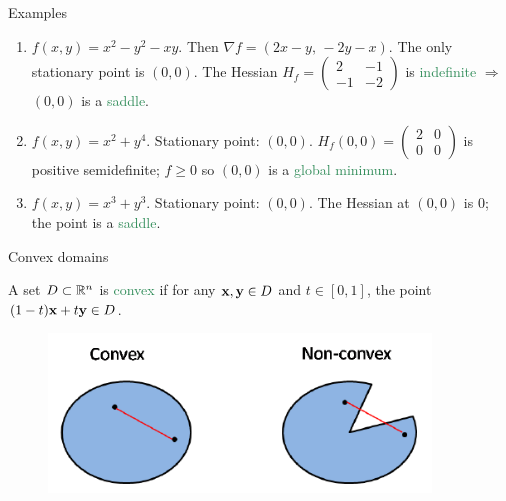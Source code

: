 \documentclass[11pt,aspectratio=169]{beamer}
\begin{document}
\begin{frame}{Examples}

\begin{enumerate}
\item \(f(x,y)=x^2-y^2-xy\). Then \(\nabla f=(2x-y,\,-2y-x)\). The only stationary point is \((0,0)\). The Hessian
\(
H_f=\begin{pmatrix}2&-1\\ -1&-2\end{pmatrix}
\)
is \textcolor{SeaGreen}{indefinite} \(\Rightarrow\) \((0,0)\) is a \textcolor{SeaGreen}{saddle}.
\item \(f(x,y)=x^2+y^4\). Stationary point: \((0,0)\). 
\(
H_f(0,0)=\begin{pmatrix}2&0\\ 0&0\end{pmatrix}
\)
is positive semidefinite; \(f\ge 0\) so \((0,0)\) is a \textcolor{SeaGreen}{global minimum}.
\item \(f(x,y)=x^3+y^3\). Stationary point: \((0,0)\). The Hessian at \((0,0)\) is \(0\); the point is a \textcolor{SeaGreen}{saddle}.
\end{enumerate}

\end{frame}

\begin{frame}{Convex domains}

A set \(D\subset\mathbb R^n\) is \textcolor{SeaGreen}{convex} if for any \({\bf x},{\bf y}\in D\) and \(t\in[0,1]\), the point \((1-t){\bf x}+t{\bf y}\in D\).

\begin{figure}
\includegraphics[width=4in]{img/convex_set}
\end{figure}
\end{frame}
\end{document}
